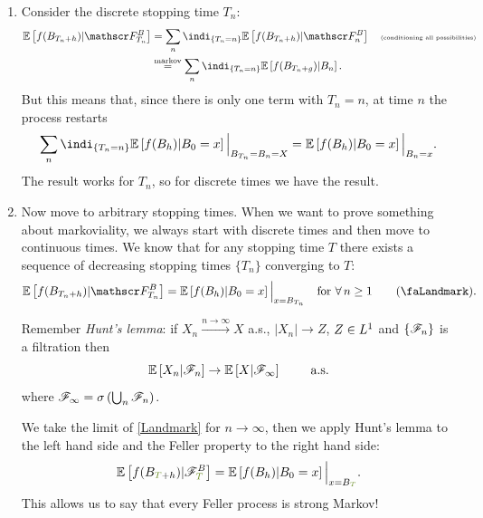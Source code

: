 \documentclass[12pt]{report}
\begin{document}
\begin{fancyproof}
	\begin{enumerate}
		\item Consider the discrete stopping time $T_{n}$:
		\begin{align*}
			\ev{f(B_{T_{n}+h})|\F_{T_{n}}^{B}}&=\sum_{n}\indi_{\{T_{n}=n\}}\ev{f(B_{T_{n}+h})|\F_{n}^{B}}\quad\text{\tiny (conditioning all possibilities)}\\
			&\stackrel{\mathrm{markov}}{=}\sum_{n}\indi_{\{T_{n}=n\}}\ev{f(B_{T_{n}+g})|B_{n}}.
		\end{align*}
		But this means that, since there is only one term with $T_n=n$, at time $n$ the process restarts
		\begin{equation*}
			\sum_{n}\indi_{\{T_{n}=n\}}\ev{f(B_{h})|B_{0}=x}\Big|_{B_{T_{n}}=B_{n}=X}=\ev{f(B_{h})|B_{0}=x}\Big|_{B_{n}=x}.
		\end{equation*}
		The result works for $T_{n}$, so for discrete times we have the result.
		\item Now move to arbitrary stopping times. When we want to prove something about markoviality, we always start with discrete times and then move to continuous times. We know that for any stopping time $T$ there exists a sequence of decreasing stopping times $\{T_{n}\}$ converging to $T$:
		\begin{equation}
			\ev{f(B_{T_{n}+h})|\F^{B}_{T_{n}}}=\ev{f(B_{h})|B_{0}=x}\Big|_{x=B_{T_{n}}}\quad\text{for }\every n\geq1\tag{\faLandmark}\label{Landmark}.
		\end{equation}
		\begin{revise}
			Remember \emph{Hunt's lemma}: if $X_{n}\xrightarrow{n\to\infty}X$ a.s., $|X_{n}|\to Z$, $Z\in L^{1}$ and $\{\mathscr{F}_{n}\}$ is a filtration then
			\begin{equation*}
				\mathbb{E}\left[X_{n}|\mathscr{F}_{n}\right]\to\mathbb{E}\left[X|\mathscr{F}_{\infty}\right]\qquad\text{ a.s.}{}
			\end{equation*}
			where $\mathscr{F}_{\infty}=\sigma\left(\bigcup_{n}\mathscr{F}_{n}\right)$.
		\end{revise}
		We take the limit of \ref{Landmark} for $n\to\infty$, then we apply Hunt's lemma to the left hand side and the Feller property to the right hand side:
		\begin{equation*}
			\ev{f(B_{\mathcolor{OliveDrab4}{T}+h})|\F_{\mathcolor{OliveDrab4}{T}}^{B}}=\ev{f(B_{h})|B_{0}=x}\Big|_{x=B_{\mathcolor{OliveDrab4}{T}}}.
		\end{equation*}
		This allows us to say that every Feller process is strong Markov!
	\end{enumerate}
\end{fancyproof}
\end{document}
